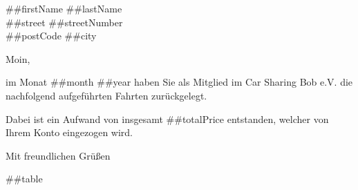 \documentclass[%
    parskip=half,
    fromalign=right,  %
    fromphone=false, fromfax=false,
    fromrule=false]{scrlttr2}
\begin{document}
\begin{letter}{ ##firstName ##lastName \\ ##street ##streetNumber\\ ##postCode ##city } 

\opening{Moin,}

im Monat ##month ##year haben Sie als Mitglied im Car Sharing Bob e.V. die nachfolgend aufgeführten Fahrten zurückgelegt.

Dabei ist ein Aufwand von insgesamt ##totalPrice entstanden, welcher von Ihrem Konto eingezogen wird.

\closing{Mit freundlichen Grüßen}


##table

\end{letter}
\end{document}
